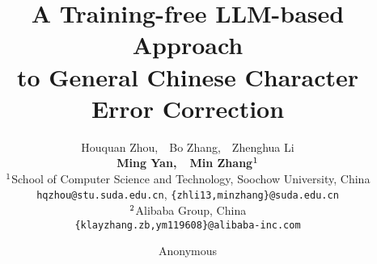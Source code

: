 \documentclass[11pt]{article}
\title{
    A Training-free LLM-based Approach\\to General Chinese Character Error Correction
}
\author{Houquan Zhou\rlap{$^{\orange}$},\ \ Bo Zhang\rlap{$^{\coconut}$},\ \ Zhenghua Li\rlap{$^{\orange\text{\Letter}}$} \\
    {\bf Ming Yan\rlap{$^{\coconut}$},\ \  Min Zhang$^{\orange}$}  \\%
    $^{\orange}$School of Computer Science and Technology, 
    Soochow University, China \\%
    \texttt{hqzhou@stu.suda.edu.cn}, \texttt{\{zhli13,minzhang\}@suda.edu.cn}\\%
    $^{\coconut}$Alibaba Group, China\\%
    \texttt{\{klayzhang.zb,ym119608\}@alibaba-inc.com}}
\author{Anonymous}
\newif\ifarxiv
\newcommand\Letter{{\fontfamily{mvs}\fontencoding{U}\selectfont\char66}}
\newcommand \footnotetextonly[1]
{
    \let \backupfootnote \thefootnote
    \let \thefootnote \relax
    \footnotetext{#1}
    \let \thefootnote \backupfootnote
    \let \backupfootnote \imreallyundefinedcommand
}
\begin{document}
\begin{CJK}{UTF8}{gkai}
    \maketitle
    \ifarxiv%
        \footnotetextonly{\!\!\Letter\ Zhenghua Li is the corresponding author.}
    \fi%


    
    
    
    
    
    
    
    
    

    
    \ifarxiv%
        
    \fi%

    

    \clearpage
    

\end{CJK}
\end{document}
